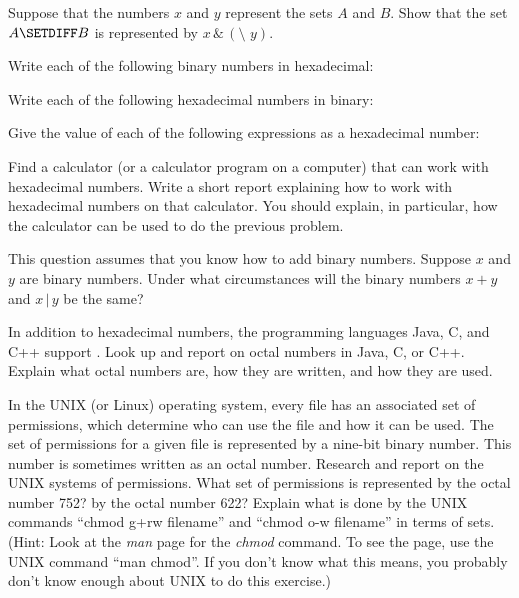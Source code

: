\begin{exercises}

\problem Suppose that the numbers $x$ and $y$ represent the
sets $A$ and $B$.  Show that the set $A\SETDIFF B$ is 
represented by $x \,\&\, (\texttt{\char`\~}y)$.

\problem Write each of the following binary numbers in hexadecimal:

\problem Write each of the following hexadecimal numbers in binary:

\problem Give the value of each of the following expressions
as a hexadecimal number:

\problem Find a calculator (or a calculator program on a computer)
that can work with hexadecimal numbers.  Write a short report
explaining how to work with hexadecimal numbers on that calculator.
You should explain, in particular, how the calculator can be used to
do the previous problem.

\problem This question assumes that you know how to add binary numbers.
Suppose $x$ and $y$ are binary numbers.  Under what circumstances
will the binary numbers $x+y$ and $x\,|\,y$ be the same?

\problem In addition to hexadecimal numbers, the programming languages
Java, C, and C++ support .  Look up
and report on octal numbers in Java, C, or C++.  Explain what octal
numbers are, how they are written, and how they are used.

\problem In the UNIX (or Linux) operating system, every file has an associated
set of permissions, which determine who can use the file and how
it can be used.  The set of permissions for a given file is represented
by a nine-bit binary number.  This number is sometimes written as an
octal number.  Research and report on the UNIX systems of permissions.
What set of permissions is represented by the octal number 752?
by the octal number 622?  Explain what is done by the UNIX commands
``chmod g+rw filename'' and ``chmod o-w filename'' in terms of sets. 
(Hint:  Look at the \textit{man} page for
the \textit{chmod} command.  To see the page, use the UNIX command
``man chmod''.  If you don't know what this means, you probably don't
know enough about UNIX to do this exercise.)


\end{exercises}
